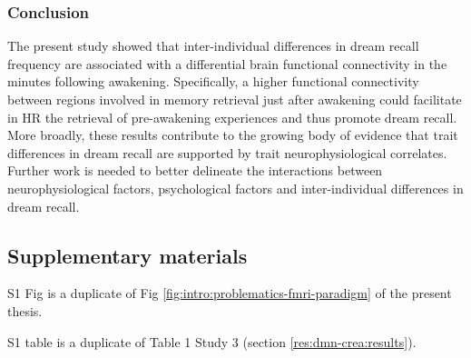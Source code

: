 \subsubsection{Conclusion}
The present study showed that inter-individual differences in dream recall frequency are associated with a differential brain functional connectivity in the minutes following awakening. Specifically, a higher functional connectivity between regions involved in memory retrieval just after awakening could facilitate in HR the retrieval of pre-awakening experiences and thus promote dream recall. More broadly, these results contribute to the growing body of evidence that trait differences in dream recall are supported by trait neurophysiological correlates. Further work is needed to better delineate the interactions between neurophysiological factors, psychological factors and inter-individual differences in dream recall.

%

\FloatBarrier

\subsection*{Supplementary materials}

S1 Fig is a duplicate of Fig \ref{fig:intro:problematics-fmri-paradigm} of the present thesis.

S1 table is a duplicate of Table 1 Study 3 (section \ref{res:dmn-crea:results}).

\vspace*{1cm}

